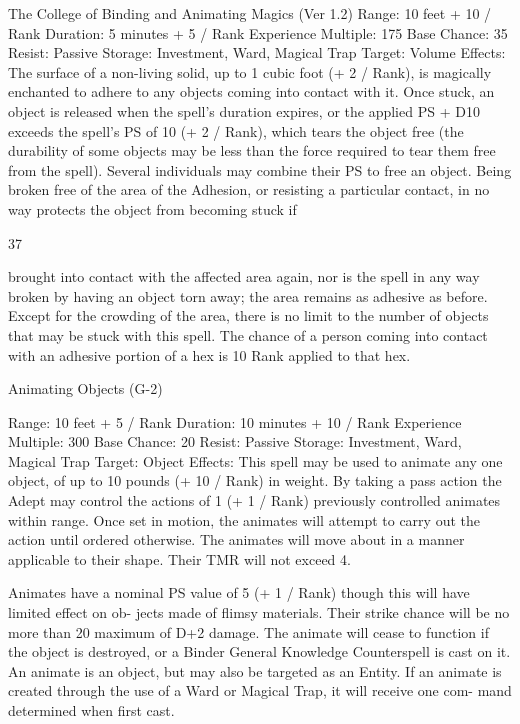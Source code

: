 \begin{Chapter}{The College of Binding and Animating Magics (Ver 1.2)}
Range: 10 feet + 10 / Rank 
Duration: 5 minutes + 5 / Rank 
Experience Multiple: 175 
Base Chance: 35%
Resist: Passive 
Storage: Investment, Ward, Magical Trap 
Target: Volume 
Effects:  The  surface  of  a  non-living  solid,  up  to  1 
cubic  foot  (+ 2  / Rank),  is  magically  enchanted to 
adhere  to  any  objects  coming  into  contact  with  it. 
Once  stuck,  an  object  is  released  when  the  spell’s 
duration expires, or the applied PS + D10 exceeds 
the  spell’s  PS  of  10  (+  2  /  Rank),  which  tears  the 
object  free  (the  durability  of  some  objects  may  be 
less than  the  force  required to  tear  them  free  from 
the  spell).  Several  individuals  may  combine  their 
PS to free an object. Being broken free of the area 
of the Adhesion, or resisting a particular contact, in 
no way protects the object from becoming stuck if 

37 

brought  into  contact  with  the  affected  area  again, 
nor  is  the  spell  in  any  way  broken  by  having  an 
object  torn  away;  the  area  remains  as  adhesive  as 
before. Except for the crowding of the area, there is 
no limit to the number of objects that may be stuck 
with this spell. The chance of a person coming into 
contact with an adhesive portion of a hex is 10%
Rank applied to that hex. 

Animating Objects (G-2) 

Range: 10 feet + 5 / Rank 
Duration: 10 minutes + 10 / Rank 
Experience Multiple: 300 
Base Chance: 20%
Resist: Passive 
Storage: Investment, Ward, Magical Trap 
Target: Object 
Effects: This spell may be used to animate any one 
object, of up to 10 pounds (+ 10 / Rank) in weight. 
By taking a pass action the Adept may control the 
actions  of  1  (+  1  /  Rank)  previously  controlled 
animates  within  range.  Once  set  in  motion,  the 
animates  will  attempt  to  carry  out  the  action  until 
ordered  otherwise.  The  animates  will  move  about 
in  a  manner  applicable  to  their  shape.  Their  TMR 
will not exceed 4. 

Animates  have  a  nominal  PS  value  of  5  (+  1  / 
Rank)  though  this  will  have  limited  effect  on  ob-
jects made of flimsy materials. Their strike chance 
will  be  no  more  than  20%
maximum of D+2 damage. The animate will cease 
to  function  if  the  object  is  destroyed,  or  a  Binder 
General  Knowledge  Counterspell  is  cast  on  it.  An 
animate is an object, but may also be targeted as an 
Entity. If an animate is created through the use of a 
Ward  or  Magical  Trap,  it  will  receive  one  com-
mand determined when first cast. 


\end{Chapter}
